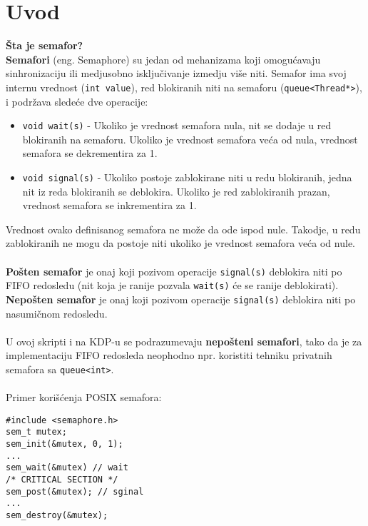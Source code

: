 \section{Uvod}
\textbf{\v{S}ta je semafor?}\\
\textbf{Semafori} (eng. Semaphore) su jedan od mehanizama koji omogu\'{c}avaju sinhronizaciju ili medjusobno isklju\v{c}ivanje izmedju vi\v{s}e niti. Semafor ima svoj internu vrednost (\texttt{int value}), red blokiranih niti na semaforu (\texttt{queue<Thread*>}), i podr\v{z}ava slede\'{c}e dve operacije:
\begin{itemize}
    \item \texttt{void wait(s)} - Ukoliko je vrednost semafora nula, nit se dodaje u red blokiranih na semaforu. Ukoliko je vrednost semafora ve\'{c}a od nula, vrednost semafora se dekrementira za 1.
    \item \texttt{void signal(s)} - Ukoliko postoje zablokirane niti u redu blokiranih, jedna nit iz reda blokiranih se deblokira. Ukoliko je red zablokiranih prazan, vrednost semafora se inkrementira za 1.
\end{itemize}
Vrednost ovako definisanog semafora ne mo\v{z}e da ode ispod nule. Takodje, u redu zablokiranih ne mogu da postoje niti ukoliko je vrednost semafora ve\'{c}a od nule.
\\\\
\textbf{Po\v{s}ten semafor} je onaj koji pozivom operacije \texttt{signal(s)} deblokira niti po FIFO redosledu (nit koja je ranije pozvala \texttt{wait(s)} \'{c}e se ranije deblokirati).\\
\textbf{Nepo\v{s}ten semafor} je onaj koji pozivom operacije \texttt{signal(s)} deblokira niti po nasumi\v{c}nom redosledu.\\\\
U ovoj skripti i na KDP-u se podrazumevaju \textbf{nepo\v{s}teni semafori}, tako da je za implementaciju FIFO redosleda neophodno npr. koristiti tehniku privatnih semafora sa \texttt{queue<int>}.
\\\\
Primer kori\v{s}\'{c}enja POSIX semafora:
\begin{lstlisting}
#include <semaphore.h>
sem_t mutex;
sem_init(&mutex, 0, 1);
...
sem_wait(&mutex) // wait 
/* CRITICAL SECTION */
sem_post(&mutex); // sginal
...
sem_destroy(&mutex);
\end{lstlisting}